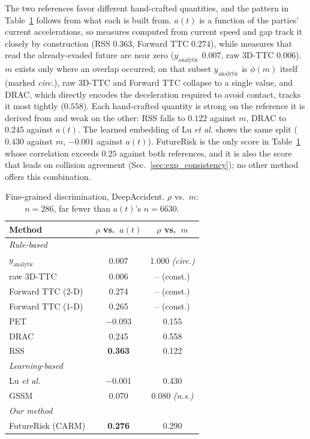 \documentclass[letterpaper, 10 pt, conference]{ieeeconf}  %
\begin{document}
The two references favor different hand-crafted quantities, and the
pattern in Table~\ref{tab:finegrained_baselines} follows from what each
is built from. $a(t)$ is a function of the parties' current
accelerations, so measures computed from current speed and gap track it
closely by construction (RSS $0.363$, Forward TTC $0.274$), while
measures that read the already-evaded future are near zero
($y_{\mathrm{analytic}}$ $0.007$, raw 3D-TTC $0.006$). $m$ exists only
where an overlap occurred; on that subset $y_{\mathrm{analytic}}$ is
$\phi(m)$ itself (marked \emph{circ.}), raw 3D-TTC and Forward TTC
collapse to a single value, and DRAC, which directly encodes the
deceleration required to avoid contact, tracks it most tightly ($0.558$).
Each hand-crafted quantity is strong on the reference it is derived from
and weak on the other: RSS falls to $0.122$ against $m$, DRAC to $0.245$
against $a(t)$. The learned embedding of Lu \emph{et al.} shows the same
split ($0.430$ against $m$, $-0.001$ against $a(t)$). FutureRisk is the
only score in Table~\ref{tab:finegrained_baselines} whose correlation
exceeds $0.25$ against both references, and it is also the score that
leads on collision agreement (Sec.~\ref{sec:exp_consistency}); no other
method offers this combination.

\begin{table}[t]
\scriptsize
\renewcommand{\arraystretch}{0.92}
\setlength{\tabcolsep}{3.5pt}
\centering
\caption{Fine-grained discrimination, DeepAccident. $\rho$ vs.\ $m$:
$n=286$, far fewer than $a(t)$'s $n=6630$.}
\label{tab:finegrained_baselines}
\begin{tabular}{lcc}
\toprule
Method & $\rho$ vs.\ $a(t)$ & $\rho$ vs.\ $m$ \\
\midrule
\multicolumn{3}{l}{\textit{Rule-based}} \\
$y_{\mathrm{analytic}}$ & 0.007 & 1.000 \emph{(circ.)} \\
raw 3D-TTC & 0.006 & -- (const.) \\
Forward TTC (2-D)~\cite{li2024beyond} & 0.274 & -- (const.) \\
Forward TTC (1-D) & 0.265 & -- (const.) \\
PET & $-$0.093 & 0.155 \\
DRAC & 0.245 & 0.558 \\
RSS~\cite{shalevshwartz2017rss} & \textbf{0.363} & 0.122 \\
\midrule
\multicolumn{3}{l}{\textit{Learning-based}} \\
Lu \emph{et al.}~\cite{lu2022learning} & $-$0.001 & 0.430 \\
GSSM~\cite{jiao2026gssm} & 0.070 & 0.080 \emph{(n.s.)} \\
\midrule
\multicolumn{3}{l}{\textit{Our method}} \\
FutureRisk (CARM) & \textbf{0.276} & 0.290 \\
\bottomrule
\end{tabular}
\end{table}
\end{document}
